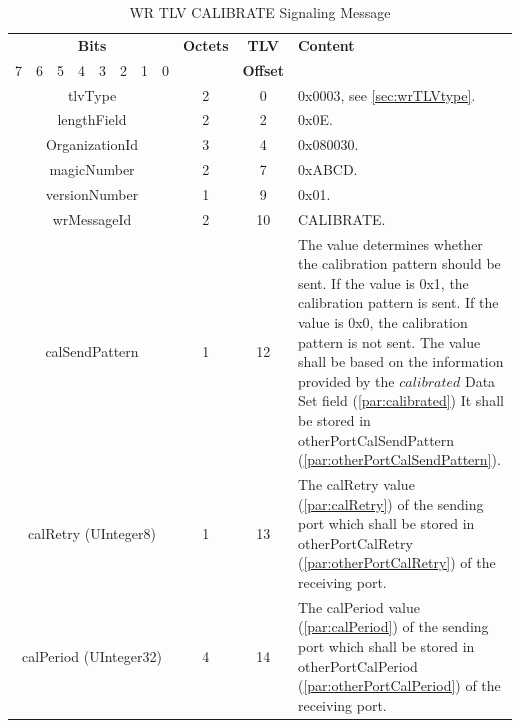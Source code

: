 \documentclass[a4paper, 12pt]{article}
\begin{document}
\begin{table}[h!]
\caption{WR TLV CALIBRATE Signaling Message }
\centering
\begin{tabular}{| c | c | c | c | c | c | c | c | c | c | p{7.5cm} |}
\hline
\multicolumn{8}{|c|}{\textbf{Bits}} & \textbf{Octets} & \textbf{TLV}  & \textbf{Content} \\
\cline{0-7}
7 & 6 & 5 & 4 & 3 & 2 & 1 & 0 &     & \textbf{Offset}  &  \\
\hline
\multicolumn{8}{|c|}{tlvType               }  & 2  & 0  & 0x0003, see \ref{sec:wrTLVtype}. \\ \hline
\multicolumn{8}{|c|}{lengthField           }  & 2  & 2  & 0x0E.   \\ \hline
\multicolumn{8}{|c|}{OrganizationId        }  & 3  & 4  & 0x080030.               \\ \hline
\multicolumn{8}{|c|}{magicNumber           }  & 2  & 7  & 0xABCD.               \\ \hline
\multicolumn{8}{|c|}{versionNumber         }  & 1  & 9  & 0x01.               \\ \hline
\multicolumn{8}{|c|}{wrMessageId           }  & 2  & 10 & CALIBRATE.               \\ \hline
\multicolumn{8}{|c|}{calSendPattern}          & 1  & 12 & The value determines whether the calibration 
						          pattern should be sent. If the value
						 	  is 0x1, the calibration pattern is sent. 
							  If the value is 0x0, the calibration 
							  pattern is not sent. The value shall be 
							  based on the information provided by the
							  $calibrated$ Data Set field 
							  (\ref{par:calibrated}) It shall be
							  stored in otherPortCalSendPattern 
							  (\ref{par:otherPortCalSendPattern}).
							  \\ \hline
\multicolumn{8}{|c|}{calRetry (UInteger8)}  & 1 & 13  & The calRetry value 
							  (\ref{par:calRetry})
							  of the sending port which shall be stored 
							  in otherPortCalRetry 
							  (\ref{par:otherPortCalRetry}) of 
							  the receiving port.\\ \hline
\multicolumn{8}{|c|}{calPeriod (UInteger32)}  & 4 & 14  & The calPeriod value 
							  (\ref{par:calPeriod})
							  of the sending port which shall be stored 
							  in otherPortCalPeriod 
							  (\ref{par:otherPortCalPeriod}) of 
							  the receiving port.\\ \hline
\end{tabular}
\label{tab:wrCalibrateTLV}
\end{table}
\end{document}
